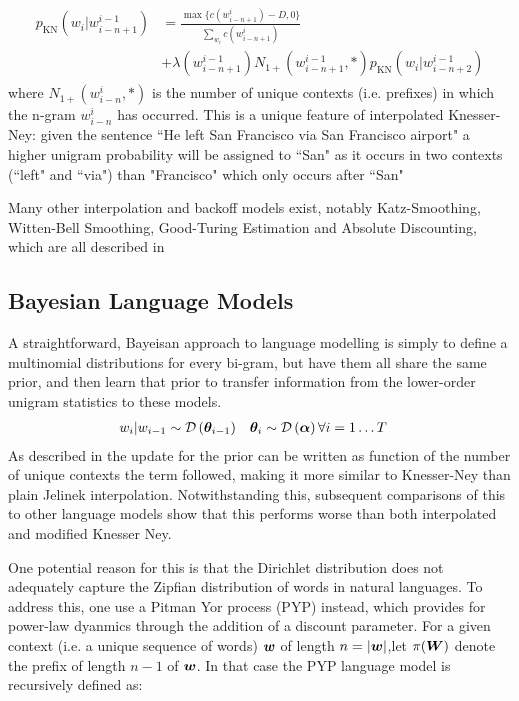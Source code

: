 \begin{align}
\begin{split}
p_\text{KN}(w_i | w^{i-1}_{i-n+1}) & = 
\frac{\max\{c(w^i_{i-n+1}) - D, 0\}}{\sum_{w_i} c(w^i_{i-n+1})} \\
& + \lambda(w^{i-1}_{i-n+1}) N_{1+}(w^{i-1}_{i-n+1}, *) p_\text{KN}(w_i | w^{i-1}_{i-n+2})
\end{split}
\end{align}
where $N_{1+}(w^{i}_{i-n}, *)$ is the number of unique contexts (i.e. prefixes) in which the n-gram $w^{i}_{i-n}$ has occurred.  This is a unique feature of interpolated Knesser-Ney: given the sentence ``He left San Francisco via San Francisco airport" a higher unigram probability will be assigned to ``San" as it occurs in two contexts (``left" and ``via") than "Francisco" which only occurs after ``San"

Many other interpolation and backoff models exist, notably Katz-Smoothing, Witten-Bell Smoothing, Good-Turing Estimation and Absolute Discounting, which are all described in \cite{Goodman2001}

\subsection*{Bayesian Language Models}
A straightforward, Bayeisan approach to language modelling is simply to define a multinomial distributions for every bi-gram, but have them all share the same prior, and then learn that prior to transfer information from the lower-order unigram statistics to these models.
\begin{align}
w_i|w_{i-1} & \sim \mathcal{D} \left( {\bm \theta_{i-1}} \right) & \bm \theta_i & \sim \mathcal{D} \left( {\bm \alpha} \right) \forall i = 1\ldots T
\end{align}
As described in\cite{MacKay1995} the update for the prior can be written as function of the number of unique contexts the term followed, making it more similar to Knesser-Ney than plain Jelinek interpolation. Notwithstanding this, subsequent comparisons of this to other language models show\cite{Teh} that this performs worse than both interpolated and modified Knesser Ney.

One potential reason for this is that the Dirichlet distribution does not adequately capture the Zipfian distribution of words in natural languages. To address this, one use a Pitman Yor process (PYP) instead, which provides for power-law dyanmics through the addition of a discount parameter. For a given context (i.e. a unique sequence of words) $\bm w$ of length $n = |\bm w|$,let $\pi(\bm W)$ denote the prefix of length $n-1$ of $\bm w$. In that case the PYP language model is recursively defined as\cite{Teh}:

